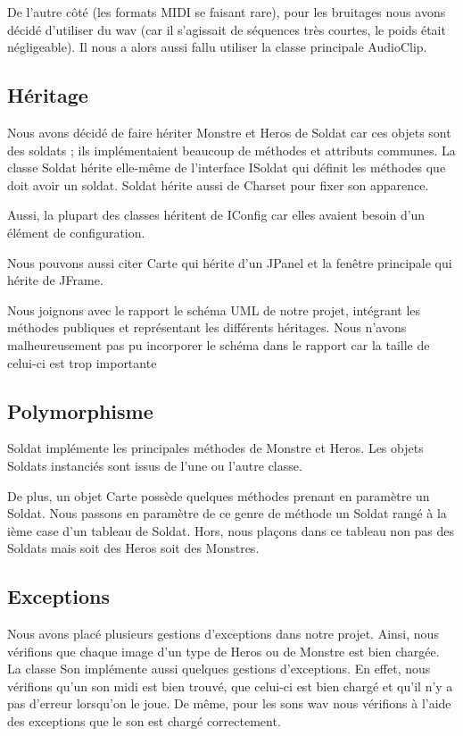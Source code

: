\documentclass{article}
\begin{document}
  De l'autre côté (les formats MIDI se faisant rare), pour les bruitages nous avons décidé d'utiliser du wav (car il s'agissait de séquences très courtes, le poids était négligeable).
  Il nous a alors aussi fallu utiliser la classe principale AudioClip.

  \subsection{Héritage}
  Nous avons décidé de faire hériter Monstre et Heros de Soldat car ces objets sont des soldats ; ils implémentaient beaucoup de méthodes et attributs communes.
  La classe Soldat hérite elle-même de l'interface ISoldat qui définit les méthodes que doit avoir un soldat. Soldat hérite aussi de Charset pour fixer son apparence.
  
  Aussi, la plupart des classes héritent de IConfig car elles avaient besoin d'un élément de configuration. 
  
  Nous pouvons aussi citer Carte qui hérite d'un JPanel et la fenêtre principale qui hérite de JFrame.
  
  Nous joignons avec le rapport le schéma UML de notre projet, intégrant les méthodes publiques et représentant les différents héritages.
  Nous n'avons malheureusement pas pu incorporer le schéma dans le rapport car la taille de celui-ci est trop importante 
  
  \subsection{Polymorphisme}
  Soldat implémente les principales méthodes de Monstre et Heros.
  Les objets Soldats instanciés sont issus de l'une ou l'autre classe.
  
  De plus, un objet Carte possède quelques méthodes prenant en paramètre un Soldat.
  Nous passons en paramètre de ce genre de méthode un Soldat rangé à la ième case d'un tableau de Soldat.
  Hors, nous plaçons dans ce tableau non pas des Soldats mais soit des Heros soit des Monstres.

  \subsection{Exceptions}
  Nous avons placé plusieurs gestions d'exceptions dans notre projet.
  Ainsi, nous vérifions que chaque image d'un type de Heros ou de Monstre est bien chargée.
  La classe Son implémente aussi quelques gestions d'exceptions.
  En effet, nous vérifions qu'un son midi est bien trouvé, que celui-ci est bien chargé et qu'il n'y a pas d'erreur lorsqu'on le joue.
  De même, pour les sons wav nous vérifions à l'aide des exceptions que le son est chargé correctement.
  
\end{document}
